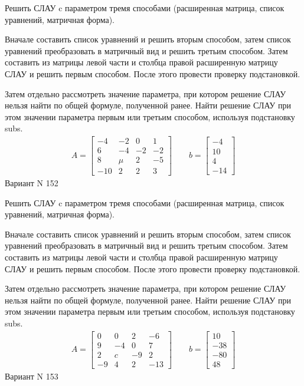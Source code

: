 \documentclass[11pt]{report}
\begin{document}
Решить СЛАУ c параметром тремя способами (расширенная матрица, список уравнений, матричная форма).

Вначале составить список уравнений и решить вторым способом,
затем список уравнений преобразовать в матричный вид и решить третьим способом.
Затем составить из матрицы левой части и столбца правой расширенную матрицу СЛАУ и решить первым способом.
После этого провести проверку подстановкой.

Затем отдельно рассмотреть значение параметра, при котором решение СЛАУ нельзя найти по общей формуле,
полученной ранее.
Найти решение СЛАУ при этом значении параметра первым или третьим способом, используя подстановку subs.
\begin{align*}
    A = \left[\begin{matrix}-4 & -2 & 0 & 1\\6 & -4 & -2 & -2\\8 & \mu & 2 & -5\\-10 & 2 & 2 & 3\end{matrix}\right]
\qquad b = \left[\begin{matrix}-4\\10\\4\\-14\end{matrix}\right]
\end{align*}
\newpage
Вариант N 152


Решить СЛАУ c параметром тремя способами (расширенная матрица, список уравнений, матричная форма).

Вначале составить список уравнений и решить вторым способом,
затем список уравнений преобразовать в матричный вид и решить третьим способом.
Затем составить из матрицы левой части и столбца правой расширенную матрицу СЛАУ и решить первым способом.
После этого провести проверку подстановкой.

Затем отдельно рассмотреть значение параметра, при котором решение СЛАУ нельзя найти по общей формуле,
полученной ранее.
Найти решение СЛАУ при этом значении параметра первым или третьим способом, используя подстановку subs.
\begin{align*}
    A = \left[\begin{matrix}0 & 0 & 2 & -6\\9 & -4 & 0 & 7\\2 & c & -9 & 2\\-9 & 4 & 2 & -13\end{matrix}\right]
\qquad b = \left[\begin{matrix}10\\-38\\-80\\48\end{matrix}\right]
\end{align*}
\newpage
Вариант N 153
\end{document}
